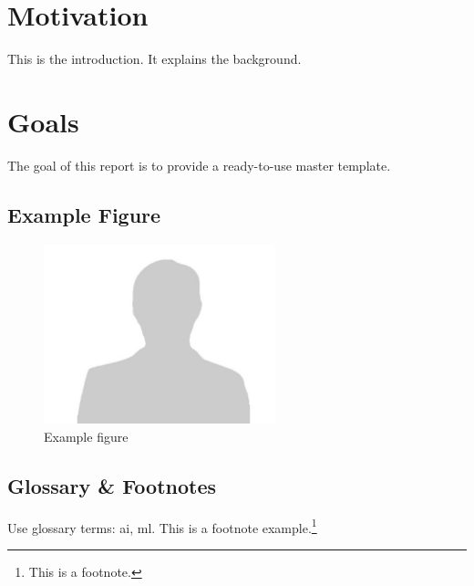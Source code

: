 \section{Motivation}
This is the introduction. It explains the background.

\section{Goals}
The goal of this report is to provide a ready-to-use master template.

\subsection{Example Figure}
\begin{figure}[h!]
    \centering
    \includegraphics[width=0.6\textwidth]{images/example-image.png}
    \caption{Example figure}
\end{figure}

\subsection{Glossary \& Footnotes}
Use glossary terms: \gls{ai}, \gls{ml}.  
This is a footnote example.\footnote{This is a footnote.}  
